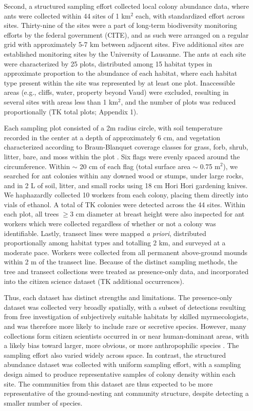 \documentclass[preprint,review,times,12pt]{elsarticle}
\begin{document}
Second, a structured sampling effort collected local colony abundance data, where ants were collected within 44 sites of 1 km$^2$ each, with standardized effort across sites. Thirty-nine of the sites were a part of long-term biodiversity monitoring efforts by the federal government (CITE), and as such were arranged on a regular grid with approximately 5-7 km between adjacent sites. Five additional sites are established monitoring sites by the University of Lausanne. The ants at each site were characterized by 25 plots, distributed among 15 habitat types \citep{Gago-Silva2017} in approximate proportion to the abundance of each habitat, where each habitat type present within the site was represented by at least one plot. Inaccessible areas (e.g., cliffs, water, property beyond Vaud) were excluded, resulting in several sites with areas less than 1 km$^2$, and the number of plots was reduced proportionally (TK total plots; Appendix 1). 

Each sampling plot consisted of a 2m radius circle, with soil temperature recorded in the center at a depth of approximately 6 cm, and vegetation characterized according to Braun-Blanquet coverage classes for grass, forb, shrub, litter, bare, and moss within the plot \citep{Douglas1978}. Six flags were evenly spaced around the circumference. Within $\sim$ 20 cm of each flag (total surface area $\sim$ 0.75 m$^2$), we searched for ant colonies within any downed wood or stumps, under large rocks, and in 2 L of soil, litter, and small rocks using 18 cm Hori Hori gardening knives. We haphazardly collected 10 workers from each colony, placing them directly into vials of ethanol. A total of TK colonies were detected across the 44 sites. Within each plot, all trees $\geq$3 cm diameter at breast height were also inspected for ant workers which were collected regardless of whether or not a colony was identifiable. Lastly, transect lines were mapped \emph{a priori}, distributed proportionally among habitat types and totalling 2 km, and surveyed at a moderate pace. Workers were collected from all permanent above-ground mounds within 2 m of the transect line. Because of the distinct sampling methods, the tree and transect collections were treated as presence-only data, and incorporated into the citizen science dataset (TK additional occurrences). 

Thus, each dataset has distinct strengths and limitations. The presence-only dataset was collected very broadly spatially, with a subset of detections resulting from free investigation of subjectively suitable habitats by skilled myrmecologists, and was therefore more likely to include rare or secretive species. However, many collections form citizen scientists occurred in or near human-dominant areas, with a likely bias toward larger, more obvious, or more anthropophilic species \citep{Ward2014, Troudet2017}. The sampling effort also varied widely across space. In contrast, the structured abundance dataset was collected with uniform sampling effort, with a sampling design aimed to produce representative samples of colony density within each site. The communities from this dataset are thus expected to be more representative of the ground-nesting ant community structure, despite detecting a smaller number of species. 
\end{document}
